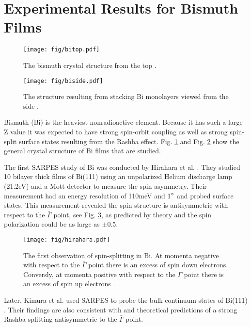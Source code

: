 \documentclass[12pt]{article}
\begin{document}
\section{Experimental Results for Bismuth Films}
\begin{figure}[th]
  \centering
  \texttt{[image: fig/bitop.pdf]}
  \caption{The bismuth crystal structure from the top \cite{Shirasawa}.}
  \label{fig:bitop}
\end{figure}
\begin{figure}[th]
  \centering
  \texttt{[image: fig/biside.pdf]}
  \caption{The structure resulting from stacking Bi monolayers viewed from the side \cite{Shirasawa}.}
  \label{fig:biside}
\end{figure}
Bismuth (Bi) is the heaviest nonradioactive element.
Because it has such a large Z value it was expected to have strong spin-orbit coupling as well as strong spin-split surface states resulting from the Rashba effect.
Fig. \ref{fig:bitop} and Fig. \ref{fig:biside} show the general crystal structure of Bi films that are studied.

The first SARPES study of Bi was conducted by Hirahara et al. \cite{Hirahara}.
They studied 10 bilayer thick films of Bi(111) using an unpolarized Helium discharge lamp (21.2eV) and a Mott detector to measure the spin asymmetry.
Their measurement had an energy resolution of 110meV and 1$\degree$ and probed surface states.
This measurement revealed the spin structure is antisymmetric with respect to the $\bar{\Gamma}$ point, see Fig. \ref{fig:hirahara}, as predicted by theory and the spin polarization could be as large as $\pm 0.5$.
\begin{figure}[h]
  \centering
  \texttt{[image: fig/hirahara.pdf]}
  \caption{The first observation of spin-splitting in Bi.  At momenta negative with respect to the $\bar{\Gamma}$ point there is an excess of spin down electrons.  Conversly, at momenta positive with respect to the $\bar{\Gamma}$ point there is an excess of spin up electrons \cite{Hirahara}.}
  \label{fig:hirahara}
\end{figure}
Later, Kimura et al. used SARPES to probe the bulk continuum states of Bi(111) \cite{Kimura}.
Their findings are also consistent with \cite{Hirahara} and theoretical predictions of a strong Rashba splitting antisymmetric to the $\bar{\Gamma}$ point.
\end{document}
